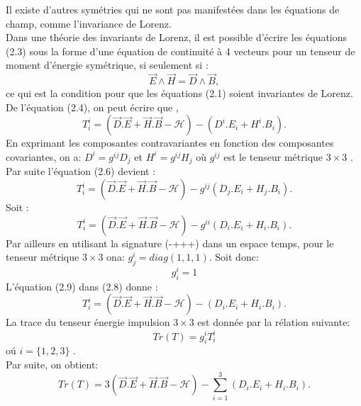 \documentclass[12pt,a4paper, openany]{report}
\begin{document}
	\hspace{0.5cm}Il existe d'autres symétries qui ne sont pas manifestées dans les équations de champ, comme l'invariance de Lorenz.\\
	Dans une théorie des invariants de Lorenz, il est possible d'écrire les équations (2.3) sous la forme d'une équation de continuité à 4 vecteurs  pour un tenseur de moment d'énergie symétrique, si seulement si :
	\begin{equation}
		\vec{E}\wedge\vec{H}=\vec{D}\wedge\vec{B},
	\end{equation}
	ce qui est la condition pour que les équations (2.1) soient invariantes de Lorenz.\\
	De l'équation (2.4), on peut écrire que ,\\
	\begin{equation}
		T_i^i=(\vec{D}.\vec{E}+\vec{H}.\vec{B}-\mathcal{H})-\left({D}^i.{E}_i+{H}^i.{B}_i\right). 
	\end{equation}
	En exprimant les composantes contravariantes en fonction des composantes covariantes, on a:
	$D^i=g^{ij}D_j$ et $H^i=g^{ij}H_j$ o\`{u} $g^{ij}$ est le tenseur métrique $3\times3$ .\\
	Par suite l'équation (2.6) devient :
	\begin{equation}
		T_i^i=(\vec{D}.\vec{E}+\vec{H}.\vec{B}-\mathcal{H})-g^{ij}({D}_j.{E}_i+{H}_j.{B}_i). 
	\end{equation}
	Soit :
	\begin{equation}
		T_i^i=(\vec{D}.\vec{E}+\vec{H}.\vec{B}-\mathcal{H})-g^{ii}({D}_i.{E}_i+{H}_i.{B}_i). 
	\end{equation}
	Par ailleurs en utilisant la signature (-\;+\;+\;+) dans un espace temps, pour le tenseur métrique $3\times3$ ona: $ g_j^{i} =diag(1,1,1)$. Soit donc:
	\begin{equation}
		g_i^{i}=1
	\end{equation}
	L'équation (2.9) dans (2.8) donne :
	\begin{equation}
		T_i^i=(\vec{D}.\vec{E}+\vec{H}.\vec{B}-\mathcal{H})-({D}_i.{E}_i+{H}_i.{B}_i). 
	\end{equation}
	La trace du tenseur énergie impulsion $3\times3$ est donnée par la rélation suivante:
	\begin{equation}
		Tr(T)= g_i^{i}T_i^i 
	\end{equation}
	o\'{u} $i=\{1,2,3\}$ .\\
	Par suite, on obtient:
	\begin{equation}
		Tr(T)=3(\vec{D}.\vec{E}+\vec{H}.\vec{B}-\mathcal{H})-\sum_{i=1}^{3}({D}_i.{E}_i+{H}_i.{B}_i). 
	\end{equation}
\end{document}
